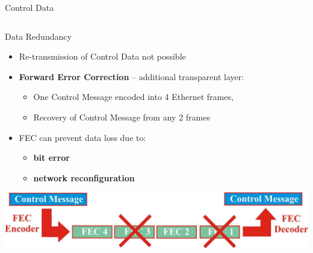 \documentclass[compress,red]{beamer}
\begin{document}
\begin{frame}{Control Data}
\begin{columns}[c]
\begin{center}
    \end{center}

\end{columns}

\end{frame}
\begin{frame}{Data Redundancy}

  \begin{itemize}
    \item Re-transmission of Control Data not possible
	\item {\bf Forward Error Correction}  -- additional transparent layer:
	\begin{itemize}
		\item One Control Message encoded into 4 Ethernet frames,
		\item Recovery of Control Message from any 2 frames
	\end{itemize}
	\item FEC can prevent data loss due to:
	\begin{itemize}	
		\item {\bf bit error} 
		\item {\bf network reconfiguration}
	\end{itemize}	
  \end{itemize}
  
  	\begin{center}
      \includegraphics[width=.7\textwidth]{robustness/FEC.pdf}
    \end{center}
  
\end{frame}
\end{document}
